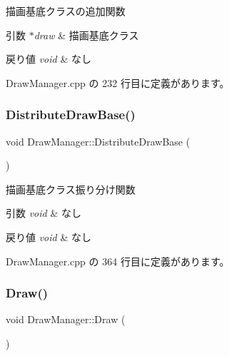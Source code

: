 描画基底クラスの追加関数 


\begin{DoxyParams}{引数}
{\em $\ast$draw} & 描画基底クラス \\
\hline
\end{DoxyParams}

\begin{DoxyRetVals}{戻り値}
{\em void} & なし \\
\hline
\end{DoxyRetVals}


 Draw\+Manager.\+cpp の 232 行目に定義があります。

\mbox{\label{class_draw_manager_a9a09cb524187bc11f1e4812a06fe46d6}} 
\subsubsection{\texorpdfstring{Distribute\+Draw\+Base()}{DistributeDrawBase()}}
{\footnotesize\ttfamily void Draw\+Manager\+::\+Distribute\+Draw\+Base (\begin{DoxyParamCaption}{ }\end{DoxyParamCaption})\hspace{0.3cm}{\ttfamily [private]}}



描画基底クラス振り分け関数 


\begin{DoxyParams}{引数}
{\em void} & なし \\
\hline
\end{DoxyParams}

\begin{DoxyRetVals}{戻り値}
{\em void} & なし \\
\hline
\end{DoxyRetVals}


 Draw\+Manager.\+cpp の 364 行目に定義があります。

\mbox{\label{class_draw_manager_a43372495e68d77a2698f211cf921b37e}} 
\subsubsection{\texorpdfstring{Draw()}{Draw()}}
{\footnotesize\ttfamily void Draw\+Manager\+::\+Draw (\begin{DoxyParamCaption}{ }\end{DoxyParamCaption})}




